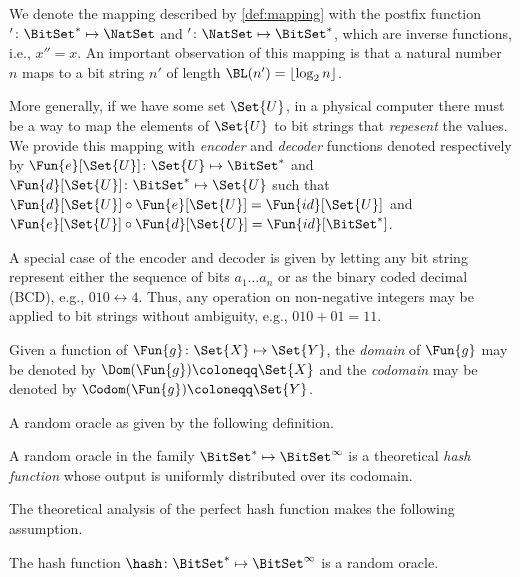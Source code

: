 \documentclass[ ../main.tex]{subfiles}
\begin{document}
We denote the mapping described by \cref{def:mapping} with the postfix function $' \colon \BitSet^* \mapsto \NatSet$ and $' \colon \NatSet \mapsto \BitSet^*$, which are inverse functions, i.e., $x'' = x$.
An important observation of this mapping is that a natural number $n$ maps to a bit string $n'$ of length $\BL(n') = \lfloor \log_2 n \rfloor$.

More generally, if we have some set $\Set{U}$, in a physical computer there must be a way to map the elements of $\Set{U}$ to bit strings that \emph{repesent} the values.
We provide this mapping with \emph{encoder} and \emph{decoder} functions denoted respectively by $\Fun{e}[\Set{U}] \colon \Set{U} \mapsto \BitSet^*$ and $\Fun{d}[\Set{U}] \colon \BitSet^* \mapsto \Set{U}$ such that $\Fun{d}[\Set{U}] \circ \Fun{e}[\Set{U}] = \Fun{id}[\Set{U}]$ and $\Fun{e}[\Set{U}] \circ \Fun{d}[\Set{U}] = \Fun{id}[\BitSet^*]$.

A special case of the encoder and decoder is given by letting any bit string represent either the sequence of bits $a_1 \ldots a_n$ or as the binary coded decimal (BCD), e.g., $010 \longleftrightarrow 4$.
Thus, any operation on non-negative integers may be applied to bit strings without ambiguity, e.g., $010 + 01 = 11$.

Given a function of $\Fun{g} \colon \Set{X} \mapsto \Set{Y}$, the \emph{domain} of $\Fun{g}$ may be denoted by $\Dom(\Fun{g}) \coloneqq \Set{X}$ and the \emph{codomain} may be denoted by $\Codom(\Fun{g}) \coloneqq \Set{Y}$.

A random oracle as given by the following definition.
\begin{definition}
\label{def:randomoracle}
A random oracle in the family $\BitSet^{*} \mapsto \BitSet^{\infty}$ is a theoretical \emph{hash function} whose output is uniformly distributed over its codomain.
\end{definition}

The theoretical analysis of the perfect hash function makes the following assumption.
\begin{assumption}
\label{asm:ro_approx}
The hash function $\hash \colon \BitSet^{*} \mapsto \BitSet^{\infty}$ is a random oracle.
\end{assumption}

\end{document}
